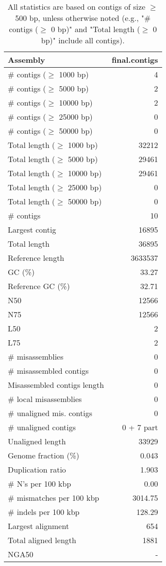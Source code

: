 \documentclass[12pt,a4paper]{article}
\begin{document}
\begin{table}[ht]
\begin{center}
\caption{All statistics are based on contigs of size $\geq$ 500 bp, unless otherwise noted (e.g., "\# contigs ($\geq$ 0 bp)" and "Total length ($\geq$ 0 bp)" include all contigs).}
\begin{tabular}{|l*{1}{|r}|}
\hline
Assembly & final.contigs \\ \hline
\# contigs ($\geq$ 1000 bp) & 4 \\ \hline
\# contigs ($\geq$ 5000 bp) & 2 \\ \hline
\# contigs ($\geq$ 10000 bp) & 2 \\ \hline
\# contigs ($\geq$ 25000 bp) & 0 \\ \hline
\# contigs ($\geq$ 50000 bp) & 0 \\ \hline
Total length ($\geq$ 1000 bp) & 32212 \\ \hline
Total length ($\geq$ 5000 bp) & 29461 \\ \hline
Total length ($\geq$ 10000 bp) & 29461 \\ \hline
Total length ($\geq$ 25000 bp) & 0 \\ \hline
Total length ($\geq$ 50000 bp) & 0 \\ \hline
\# contigs & 10 \\ \hline
Largest contig & 16895 \\ \hline
Total length & 36895 \\ \hline
Reference length & 3633537 \\ \hline
GC (\%) & 33.27 \\ \hline
Reference GC (\%) & 32.71 \\ \hline
N50 & 12566 \\ \hline
N75 & 12566 \\ \hline
L50 & 2 \\ \hline
L75 & 2 \\ \hline
\# misassemblies & 0 \\ \hline
\# misassembled contigs & 0 \\ \hline
Misassembled contigs length & 0 \\ \hline
\# local misassemblies & 0 \\ \hline
\# unaligned mis. contigs & 0 \\ \hline
\# unaligned contigs & 0 + 7 part \\ \hline
Unaligned length & 33929 \\ \hline
Genome fraction (\%) & 0.043 \\ \hline
Duplication ratio & 1.903 \\ \hline
\# N's per 100 kbp & 0.00 \\ \hline
\# mismatches per 100 kbp & 3014.75 \\ \hline
\# indels per 100 kbp & 128.29 \\ \hline
Largest alignment & 654 \\ \hline
Total aligned length & 1881 \\ \hline
NGA50 & - \\ \hline
\end{tabular}
\end{center}
\end{table}
\end{document}
